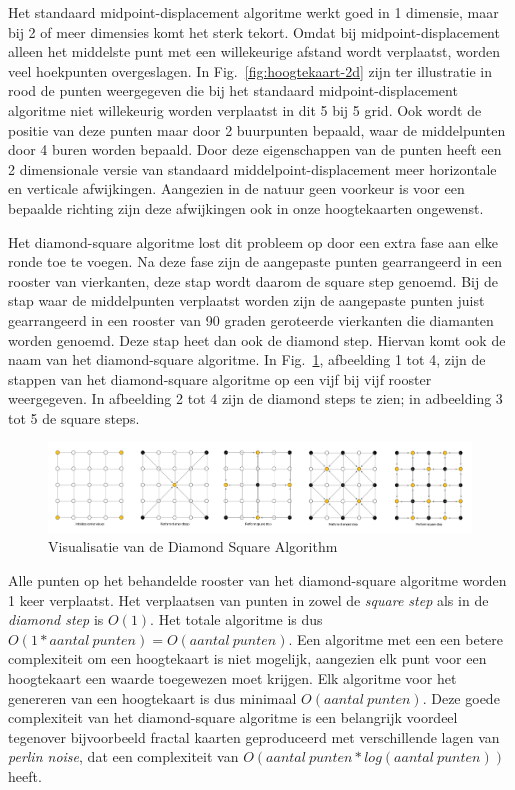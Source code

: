 \documentclass{article}
\begin{document}
Het standaard midpoint-displacement algoritme werkt goed in 1 dimensie, maar bij 2 of meer dimensies komt het sterk tekort. Omdat bij midpoint-displacement alleen het middelste punt met een willekeurige afstand wordt verplaatst, worden veel hoekpunten overgeslagen. In Fig.~\ref{fig:hoogtekaart-2d} zijn ter illustratie in rood de punten weergegeven die bij het standaard midpoint-displacement algoritme niet willekeurig worden verplaatst in dit 5 bij 5 grid. Ook wordt de positie van deze punten maar door 2 buurpunten bepaald, waar de middelpunten door 4 buren worden bepaald. Door deze eigenschappen van de punten heeft een 2 dimensionale versie van standaard middelpoint-displacement meer horizontale en verticale afwijkingen. Aangezien in de natuur geen voorkeur is voor een bepaalde richting zijn deze afwijkingen ook in onze hoogtekaarten ongewenst. 

Het diamond-square algoritme lost dit probleem op door een extra fase aan elke ronde toe te voegen. Na deze fase zijn de aangepaste punten gearrangeerd in een rooster van vierkanten, deze stap wordt daarom de square step genoemd. Bij de stap waar de middelpunten verplaatst worden zijn de aangepaste punten juist gearrangeerd in een rooster van 90 graden geroteerde vierkanten die diamanten worden genoemd. Deze stap heet dan ook de diamond step. Hiervan komt ook de naam van het diamond-square algoritme. In Fig.~\ref{fig:diamond-square}, afbeelding 1 tot 4, zijn de stappen van het diamond-square algoritme op een vijf bij vijf rooster weergegeven. In afbeelding 2 tot 4 zijn de diamond steps te zien; in adbeelding 3 tot 5 de square steps.

\begin{figure}[h!]
  \includegraphics[width=\linewidth]{diamond-square.png}
  \caption{Visualisatie van de Diamond Square Algorithm\cite{diamond-square}}
  \label{fig:diamond-square}
\end{figure}

Alle punten op het behandelde rooster van het diamond-square algoritme worden 1 keer verplaatst. Het verplaatsen van punten in zowel de \emph{square step} als in de \emph{diamond step} is $O(1)$. Het totale algoritme is dus $O(1 * aantal~punten) = O(aantal~punten)$. Een algoritme met een een betere complexiteit om een hoogtekaart is niet mogelijk, aangezien elk punt voor een hoogtekaart een waarde toegewezen moet krijgen. Elk algoritme voor het genereren van een hoogtekaart is dus minimaal $O(aantal~punten)$. Deze goede complexiteit van het diamond-square algoritme is een belangrijk voordeel tegenover bijvoorbeeld fractal kaarten geproduceerd met verschillende lagen van \emph{perlin noise}, dat een complexiteit van $O(aantal~punten * log(aantal~punten))$ heeft.
\end{document}
